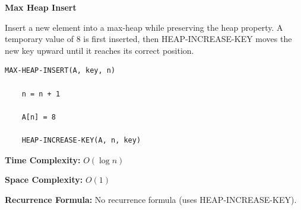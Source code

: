 \documentclass[a4paper,12pt]{article}
\begin{document}
\begin{tcolorbox}[
    colback=gray!30,
    colframe=black,
    boxrule=1pt,
    arc=0mm
]

\begin{tcolorbox}[
    colback=gray!10,
    colframe=black,
    arc=0mm
]
\centering
{\Huge\bfseries Max Heap Insert}
\end{tcolorbox}


\begin{tcolorbox}[
    colback=gray!10,
    colframe=black,
    arc=0mm
]
\small
Insert a new element into a max-heap while preserving the heap property.
A temporary value of $8$ is first inserted, then HEAP-INCREASE-KEY
moves the new key upward until it reaches its correct position.
\end{tcolorbox}


\begin{tcolorbox}[
    colback=black!5,
    colframe=black,
    arc=0mm,
    title=Pseudo-code
]
\tiny
\begin{lstlisting}
MAX-HEAP-INSERT(A, key, n)

    n = n + 1

    A[n] = 8

    HEAP-INCREASE-KEY(A, n, key)
\end{lstlisting}
\end{tcolorbox}


\begin{tcolorbox}[
    colback=cyan!20,
    colframe=black,
    arc=0mm
]
\small
\textbf{Time Complexity:}
$O(\log n)$
\end{tcolorbox}


\begin{tcolorbox}[
    colback=violet!20,
    colframe=black,
    arc=0mm
]
\small
\textbf{Space Complexity:}
$O(1)$
\end{tcolorbox}


\begin{tcolorbox}[
    colback=pink!20,
    colframe=black,
    arc=0mm
]
\small
\textbf{Recurrence Formula:}
No recurrence formula (uses HEAP-INCREASE-KEY).
\end{tcolorbox}

\end{tcolorbox}
\end{document}
